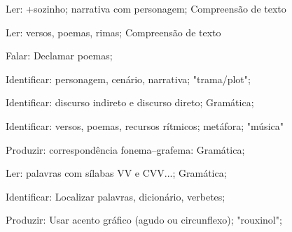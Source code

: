  Ler: +sozinho; narrativa com personagem; Compreensão de texto

 Ler: versos, poemas, rimas; Compreensão de texto

 Falar: Declamar poemas;

 Identificar: personagem, cenário, narrativa; "trama/plot";

 Identificar: discurso indireto e discurso direto; Gramática;

 Identificar: versos, poemas, recursos rítmicos; metáfora; "música"

 Produzir: correspondência fonema--grafema: Gramática;

 Ler:  palavras com sílabas VV e CVV...; Gramática;

 Identificar: Localizar palavras, dicionário, verbetes;

 Produzir: Usar acento gráfico (agudo ou circunflexo); "rouxinol";

